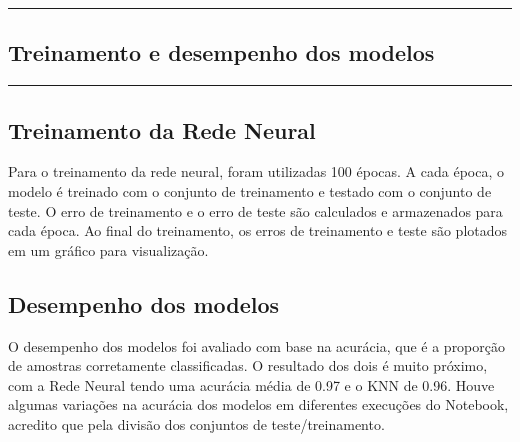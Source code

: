 {\color{gray}\hrule}
\begin{center}
\section{Treinamento e desempenho dos modelos}
\end{center}
{\color{gray}\hrule}
\begin{multicols}{2}
\subsection{Treinamento da Rede Neural}

Para o treinamento da rede neural, foram utilizadas 100 épocas.
A cada época, o modelo é treinado com o conjunto de treinamento e testado com o conjunto de teste.
O erro de treinamento e o erro de teste são calculados e armazenados para cada época.
Ao final do treinamento, os erros de treinamento e teste são plotados em um gráfico para visualização.

\subsection{Desempenho dos modelos}

O desempenho dos modelos foi avaliado com base na acurácia, que é a proporção de amostras corretamente classificadas.
O resultado dos dois é muito próximo, com a Rede Neural tendo uma acurácia média de 0.97 e o KNN de 0.96.
Houve algumas variações na acurácia dos modelos em diferentes execuções do Notebook, acredito que pela divisão dos conjuntos de teste/treinamento.

\end{multicols}